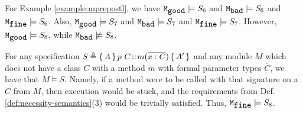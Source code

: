  
 \begin{example}
 \label{example:mprepostlsatissy}
 For  %
 Example \ref{example:mprepostl}, we have
  $\ModA \models S_6$ and $\ModB \models S_6$ and  $\ModC \models S_6$.
Also,  $\ModA \models S_7$ and $\ModB \models S_7$ and  $\ModC \models S_7$.
However,   $\ModA  \models S_8$, while $\ModB  \not\models S_8$.
\end{example}

 \begin{example}
\label{example:mprepostlsatissy}
 For  %
any   specification  $S \triangleq {\mprepost{A}{p\ C}{m}{x}{C}{A'} }$ and any module  $M$ which does not have a class $C$  with a method $m$ with formal parameter  types ${\overline C}$, we have that $M \models S$.
Namely, if a method were to be called with that signature on a $C$  from $M$, then execution would be stuck, and the requirements from Def. \ref{def:necessity-semantics}(3) would be trivially satisfied.
Thus,   $\ModC \models S_8$. %
\end{example}

 

